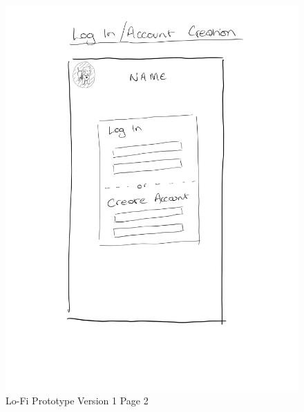 \documentclass{ueacmpstyle}
\begin{document}
            \begin{figure}[h]
                
                \includegraphics[width=\linewidth]{Images/Lofi_v1_b.jpg}
                \caption{Lo-Fi Prototype Version 1 Page 2}
                \label{Figure Lofi v1 2}
            
            \end{figure}
            \clearpage
\end{document}

